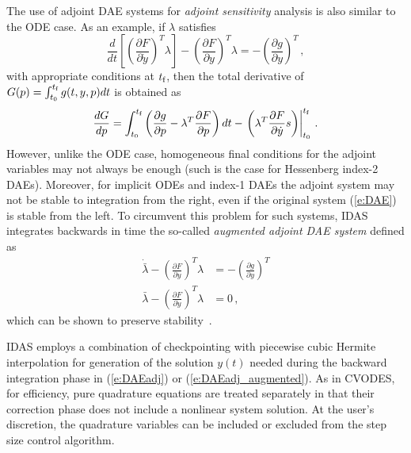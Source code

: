 The use of adjoint DAE systems for {\em adjoint sensitivity} analysis is also
similar to the ODE case. As an example, if $\lambda$ satisfies
\begin{equation}\label{e:DAEadj}
  \frac{d}{dt} \left[ \left( \frac{\partial F}{\partial \dot{y}}\right) ^T \lambda \right]
  - \left(\frac{\partial F}{\partial y}\right)^T \lambda
  = - \left( \frac{\partial g}{\partial y}\right)^T \, ,
\end{equation}
with appropriate conditions at $t_{\mbox{\scriptsize f}}$, then the total derivative of
$G(p) = \int_{t_0}^{t_{\mbox{\tiny f}}} g(t,y,p) dt$ is obtained as
\begin{equation*}
  \frac{dG}{dp} =
  \int_{t_0}^{t_{\mbox{\tiny f}}} \left(
    \frac{\partial g}{\partial p} - \lambda^T \frac{\partial F}{\partial p}
  \right) dt
  - \left.\left(
      \lambda^T \frac{\partial F}{\partial \dot{y}} s
    \right)\right|_{t_0}^{t_{\mbox{\tiny f}}} \, .
\end{equation*}
However, unlike the ODE case, homogeneous final conditions for the
adjoint variables may not always be enough (such is the case for
Hessenberg index-2 DAEs).
%
Moreover, for implicit ODEs and index-1 DAEs the adjoint system may not
be stable to integration from the right, even if the original system (\ref{e:DAE})
is stable from the left. To circumvent this problem for such
systems, IDAS integrates backwards in time the so-called
{\em augmented adjoint DAE system} defined as
\begin{equation} \label{e:DAEadj_augmented}
\begin{split}
  \dot {\bar\lambda} -  \left(\frac{\partial F}{\partial y}\right)^T \lambda
  &  = - \left( \frac{\partial g}{\partial y}\right)^T \\
  \bar \lambda - \left( \frac{\partial F}{\partial \dot{y}}\right) ^T \lambda
  & = 0 \, ,
\end{split}
\end{equation}
which can be shown to preserve stability~\cite{CLPS:03}.

IDAS employs a combination of checkpointing with piecewise cubic Hermite
interpolation for generation of the solution $y(t)$ needed during the
backward integration phase in (\ref{e:DAEadj}) or (\ref{e:DAEadj_augmented}).
As in CVODES, for efficiency, pure quadrature equations are treated separately
in that their correction phase does not include a nonlinear system solution.
At the user's discretion, the quadrature variables can be included or excluded
from the step size control algorithm.

